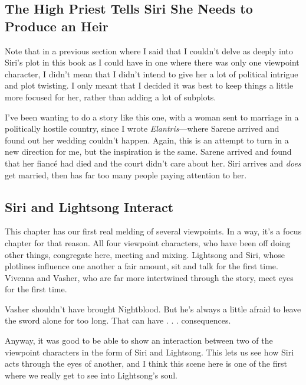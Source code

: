 \subsection*{The High Priest Tells Siri She Needs to Produce an Heir}

Note that in a previous section where I said that I couldn’t delve as deeply into Siri’s plot in this book as I could have in one where there was only one viewpoint character, I didn’t mean that I didn’t intend to give her a lot of political intrigue and plot twisting. I only meant that I decided it was best to keep things a little more focused for her, rather than adding a lot of subplots.

I’ve been wanting to do a story like this one, with a woman sent to marriage in a politically hostile country, since I wrote \textit{Elantris}—where Sarene arrived and found out her wedding couldn’t happen. Again, this is an attempt to turn in a new direction for me, but the inspiration is the same. Sarene arrived and found that her fiancé had died and the court didn’t care about her. Siri arrives and \textit{does} get married, then has far too many people paying attention to her.

\subsection*{Siri and Lightsong Interact}

This chapter has our first real melding of several viewpoints. In a way, it’s a focus chapter for that reason. All four viewpoint characters, who have been off doing other things, congregate here, meeting and mixing. Lightsong and Siri, whose plotlines influence one another a fair amount, sit and talk for the first time. Vivenna and Vasher, who are far more intertwined through the story, meet eyes for the first time.

Vasher shouldn’t have brought Nightblood. But he’s always a little afraid to leave the sword alone for too long. That can have . . . consequences.

Anyway, it was good to be able to show an interaction between two of the viewpoint characters in the form of Siri and Lightsong. This lets us see how Siri acts through the eyes of another, and I think this scene here is one of the first where we really get to see into Lightsong’s soul.



